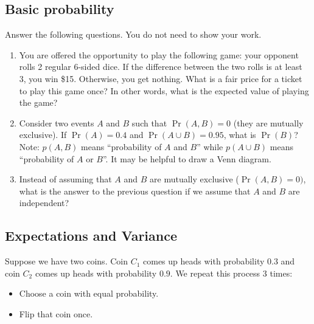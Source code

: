 


    \subsection{Basic probability}
    Answer the following questions. You do not need to show your work.

    \begin{enumerate}
        \item You are offered the opportunity to play the following game: your opponent rolls 2 regular 6-sided dice. If the difference between the two rolls is at least 3, you win \$15. Otherwise, you get nothing. What is a fair price for a ticket to play this game once? In other words, what is the expected value of playing the game?
        
        \item Consider two events $A$ and $B$ such that $\Pr(A, B)=0$ (they are mutually exclusive). If $\Pr(A) = 0.4$ and $\Pr(A \cup B) = 0.95$, what is $\Pr(B)$? Note: $p(A, B)$ means ``probability of $A$ and $B$'' while $p(A \cup B)$ means ``probability of $A$ or $B$''. It may be helpful to draw a Venn diagram.
        
        \item Instead of assuming that $A$ and $B$ are mutually exclusive ($\Pr(A,B) = 0)$, what is the answer to the previous question if we assume that $A$ and $B$ are independent?
    \end{enumerate}


    \subsection{Expectations and Variance}

    Suppose we have two coins. Coin $C_1$ comes up heads with probability $0.3$ and coin $C_2$ comes up heads with probability $0.9$. We repeat this process 3 times:
    \begin{itemize}
        \item Choose a coin with equal probability. 
        \item Flip that coin once. 
    \end{itemize}

